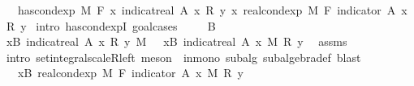 \begin{isabellebody}
\ \ \ {\isachardoublequoteopen}has{\isacharunderscore}{\kern0pt}cond{\isacharunderscore}{\kern0pt}exp\ M\ F\ {\isacharparenleft}{\kern0pt}{\isasymlambda}x{\isachardot}{\kern0pt}\ indicat{\isacharunderscore}{\kern0pt}real\ A\ x\ {\isacharasterisk}{\kern0pt}\isactrlsub R\ y{\isacharparenright}{\kern0pt}\ {\isacharparenleft}{\kern0pt}{\isasymlambda}x{\isachardot}{\kern0pt}\ real{\isacharunderscore}{\kern0pt}cond{\isacharunderscore}{\kern0pt}exp\ M\ F\ {\isacharparenleft}{\kern0pt}indicator\ A{\isacharparenright}{\kern0pt}\ x\ {\isacharasterisk}{\kern0pt}\isactrlsub R\ y{\isacharparenright}{\kern0pt}{\isachardoublequoteclose}\isanewline
%
\isadelimproof
%
\endisadelimproof
%
\isatagproof
{}\isamarkupfalse%
\ {\isacharparenleft}{\kern0pt}intro\ has{\isacharunderscore}{\kern0pt}cond{\isacharunderscore}{\kern0pt}expI{\isacharprime}{\kern0pt}{\isacharcomma}{\kern0pt}\ goal{\isacharunderscore}{\kern0pt}cases{\isacharparenright}{\kern0pt}\isanewline
\ \ \isamarkupfalse%
\ {\isacharparenleft}{\kern0pt}{}\ B{\isacharparenright}{\kern0pt}\isanewline
\ \ \isamarkupfalse%
\ {\isachardoublequoteopen}{\isasymintegral}x{\isasymin}B{\isachardot}{\kern0pt}\ {\isacharparenleft}{\kern0pt}indicat{\isacharunderscore}{\kern0pt}real\ A\ x\ {\isacharasterisk}{\kern0pt}\isactrlsub R\ y{\isacharparenright}{\kern0pt}\ {\isasympartial}M\ \ {\isacharequal}{\kern0pt}\ {\isacharparenleft}{\kern0pt}{\isasymintegral}x{\isasymin}B{\isachardot}{\kern0pt}\ indicat{\isacharunderscore}{\kern0pt}real\ A\ x\ {\isasympartial}M{\isacharparenright}{\kern0pt}\ {\isacharasterisk}{\kern0pt}\isactrlsub R\ y{\isachardoublequoteclose}\ \isamarkupfalse%
\ assms\ \isamarkupfalse%
\ {\isacharparenleft}{\kern0pt}intro\ set{\isacharunderscore}{\kern0pt}integral{\isacharunderscore}{\kern0pt}scaleR{\isacharunderscore}{\kern0pt}left{\isacharcomma}{\kern0pt}\ meson\ {}\ in{\isacharunderscore}{\kern0pt}mono\ subalg\ subalgebra{\isacharunderscore}{\kern0pt}def{\isacharcomma}{\kern0pt}\ blast{\isacharparenright}{\kern0pt}\isanewline
\ \ \isamarkupfalse%
\ \isamarkupfalse%
\ {\isachardoublequoteopen}{\isachardot}{\kern0pt}{\isachardot}{\kern0pt}{\isachardot}{\kern0pt}\ {\isacharequal}{\kern0pt}\ {\isacharparenleft}{\kern0pt}{\isasymintegral}x{\isasymin}B{\isachardot}{\kern0pt}\ real{\isacharunderscore}{\kern0pt}cond{\isacharunderscore}{\kern0pt}exp\ M\ F\ {\isacharparenleft}{\kern0pt}indicator\ A{\isacharparenright}{\kern0pt}\ x\ {\isasympartial}M{\isacharparenright}{\kern0pt}\ {\isacharasterisk}{\kern0pt}\isactrlsub R\ y{\isachardoublequoteclose}\ \isamarkupfalse%

\end{isabellebody}
